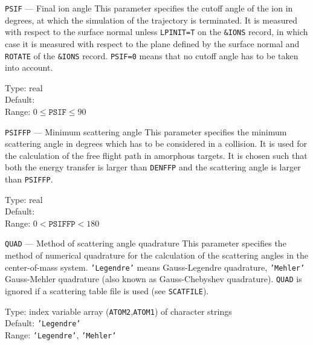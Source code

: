 \begin{keydescription}{\texttt{PSIF} --- Final ion angle}
%
  This parameter specifies the cutoff angle of the ion in degrees, at
  which the simulation of the trajectory is terminated. It is measured
  with respect to the surface normal unless \texttt{LPINIT=T} on the
  \texttt{\&IONS} record, in which case it is measured with respect to
  the plane defined by the surface normal and \texttt{ROTATE} of the
  \texttt{\&IONS} record.  \texttt{PSIF=0} means that no cutoff angle
  has to be taken into account.
  \begin{keytab}
    Type:    \> real \\
    Default:  \\
    Range:   \> $0 \le \texttt{PSIF} \le 90$
  \end{keytab}
\end{keydescription}

\begin{keydescription}{\texttt{PSIFFP} --- Minimum scattering angle}
%
  This parameter specifies the minimum scattering angle in degrees which has
  to be considered in a collision. It is used for the calculation of the 
  free flight path in amorphous targets. It is chosen such that both 
  the energy transfer is larger than \texttt{DENFFP} and the scattering angle
  is larger than \texttt{PSIFFP}.
  \begin{keytab}
    Type:    \> real \\
    Default:  \\
    Range:   \> $0 < \texttt{PSIFFP} < 180$
  \end{keytab}
\end{keydescription}

\begin{keydescription}{\texttt{QUAD} --- Method of scattering angle quadrature}
%
  This parameter specifies the method of numerical quadrature for the
  calculation of the scattering angles in the center-of-mass system. 
  \texttt{'Legendre'} means Gauss-Legendre quadrature, \texttt{'Mehler'} 
  Gauss-Mehler quadrature (also known as Gauss-Chebyshev quadrature). 
  \texttt{QUAD} is ignored if a scattering table file is used (see 
  \texttt{SCATFILE}).
  \begin{keytab}
    Type:    \> index variable array (\texttt{ATOM2},\texttt{ATOM1}) 
                of character strings \\
    Default: \> \texttt{'Legendre'} \\
    Range:   \> \texttt{'Legendre'}, \texttt{'Mehler'}
  \end{keytab}
\end{keydescription}

